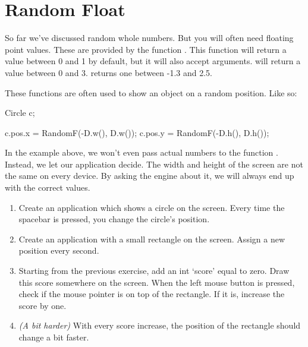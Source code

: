 \section{Random Float}
So far we've discussed random whole numbers. But you will often need floating point values. These are provided by the function . This function will return a value between 0 and 1 by default, but it will also accept arguments.  will return a value between 0 and 3.  returns one between -1.3 and 2.5.

These functions are often used to show an object on a random position. Like so:

\begin{code}
Circle c;

c.pos.x = RandomF(-D.w(), D.w());
c.pos.y = RandomF(-D.h(), D.h());
\end{code}

In the example above, we won't even pass actual numbers to the function . Instead, we let our application decide. The width and height of the screen are not the same on every device. By asking the engine about it, we will always end up with the correct values.

\begin{exercise}
\begin{enumerate}
\item Create an application which shows a circle on the screen. Every time the spacebar is pressed, you change the circle's position.
\item Create an application with a small rectangle on the screen. Assign a new position every second. 
\item Starting from the previous exercise, add an int `score' equal to zero. Draw this score somewhere on the screen. When the left mouse button is pressed, check if the mouse pointer is on top of the rectangle. If it is, increase the score by one.
\item \textit{(A bit harder)} With every score increase, the position of the rectangle should change a bit faster.
\end{enumerate}  
\end{exercise}



